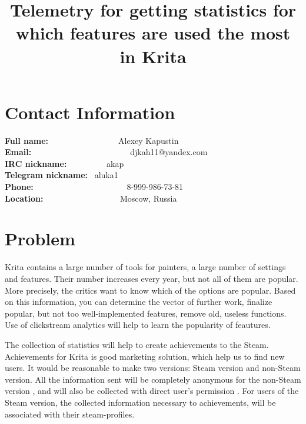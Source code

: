 \documentclass[]{article}
\title{Telemetry for getting statistics for which features are used the most in Krita} %
\begin{document}
\maketitle
\section{Contact Information}
\textbf{Full name:}~~~~~~~~~~~~~~~~~Alexey Kapustin \\
\textbf{Email:}~~~~~~~~~~~~~~~~~~~~~~~~djkah11@yandex.com \\
\textbf{IRC nickname:      }~~~~~~~~~akap \\
\textbf{Telegram nickname: }~aluka1 \\
\textbf{Phone: }~~~~~~~~~~~~~~~~~~~~~~8-999-986-73-81 \\
\textbf{Location:          }~~~~~~~~~~~~~~~~~~Moscow, Russia
\section{Problem}
Krita contains a large number of tools for painters, a large number of settings and features.
Their number increases every year, but not all of them are popular. More precisely, the critics want to know which of the options are popular. Based on this information, you can determine the vector of further work, finalize popular, but not too well-implemented features, remove old, useless functions. Use of clickstream analytics will help to learn the popularity of feautures.

The collection of statistics will help to create  achievements to the Steam. Achievements for Krita is good marketing solution, which help us to find new users. It would be reasonable to make two versions: Steam version and non-Steam version. All the information sent will be completely anonymous for the non-Steam version , and will also be collected with direct user's permission . For users of the Steam version, the collected information necessary to achievements, will be associated with their steam-profiles.

\end{document}
